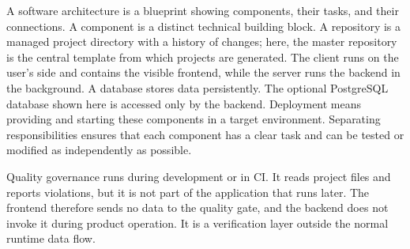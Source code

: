 \begin{beginnerstatement}

A software architecture is a blueprint showing components, their tasks, and
their connections. A component is a distinct technical building block. A
repository is a managed project directory with a history of changes; here, the
master repository is the central template from which projects are generated.
The client runs on the user's side and contains the visible frontend, while the
server runs the backend in the background. A database stores data persistently.
The optional PostgreSQL database shown here is accessed only by the backend.
Deployment means providing and starting these components in a target
environment. Separating
responsibilities ensures that each component has a clear task and can be tested
or modified as independently as possible.

Quality governance runs during development or in CI. It reads project files
and reports violations, but it is not part of the application that runs later.
The frontend therefore sends no data to the quality gate, and the backend does
not invoke it during product operation. It is a verification layer outside the
normal runtime data flow.

\end{beginnerstatement}
